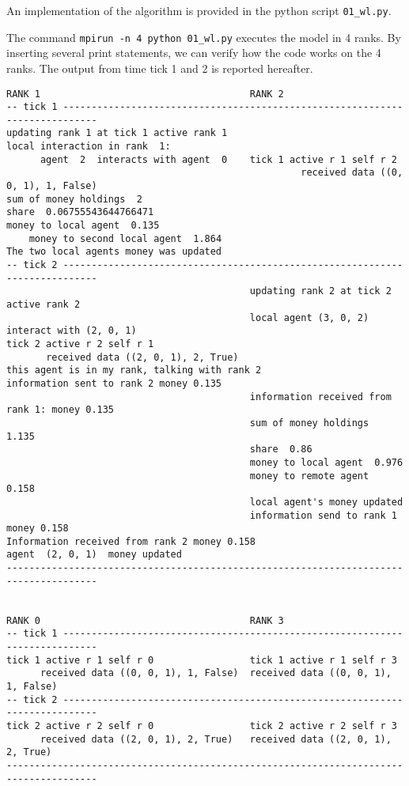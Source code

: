 \documentclass{article}
\begin{document}
An implementation of the algorithm is provided in the python script \verb+01_wl.py+.

The command
\verb+mpirun -n 4 python 01_wl.py+ executes the model in 4 ranks.
By inserting several print statements, we can verify how the code works on the 4 ranks. The output from time tick 1 and 2 is reported hereafter.


\footnotesize
\begin{verbatim}
RANK 1                                     RANK 2
-- tick 1 ----------------------------------------------------------------------------
updating rank 1 at tick 1 active rank 1
local interaction in rank  1:          
      agent  2  interacts with agent  0    tick 1 active r 1 self r 2 
                                                    received data ((0, 0, 1), 1, False)
sum of money holdings  2
share  0.06755543644766471
money to local agent  0.135  
    money to second local agent  1.864 
The two local agents money was updated 
-- tick 2 ----------------------------------------------------------------------------
                                           updating rank 2 at tick 2 active rank 2
                                           local agent (3, 0, 2) interact with (2, 0, 1)
tick 2 active r 2 self r 1 
       received data ((2, 0, 1), 2, True)
this agent is in my rank, talking with rank 2
information sent to rank 2 money 0.135
                                           information received from rank 1: money 0.135
                                           sum of money holdings  1.135
                                           share  0.86
                                           money to local agent  0.976
                                           money to remote agent  0.158
                                           local agent's money updated
                                           information send to rank 1 money 0.158
Information received from rank 2 money 0.158
agent  (2, 0, 1)  money updated
--------------------------------------------------------------------------------------


RANK 0                                     RANK 3
-- tick 1 ----------------------------------------------------------------------------
tick 1 active r 1 self r 0                 tick 1 active r 1 self r 3 
      received data ((0, 0, 1), 1, False)  received data ((0, 0, 1), 1, False)
-- tick 2 ----------------------------------------------------------------------------
tick 2 active r 2 self r 0                 tick 2 active r 2 self r 3
      received data ((2, 0, 1), 2, True)   received data ((2, 0, 1), 2, True)
--------------------------------------------------------------------------------------
\end{verbatim}
\normalsize
\end{document}
